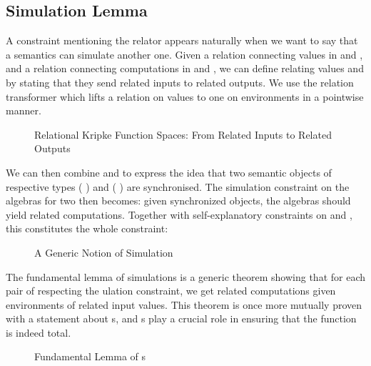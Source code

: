

\subsection{Simulation Lemma}\label{section:simulation}

A constraint mentioning the relator appears naturally when we want to say that a
semantics can simulate another one. Given a relation  connecting values
in  and , and a relation  connecting computations in
 and , we can define  relating values
   and   
by stating that they send related inputs to related outputs. We use
the relation transformer  which lifts a relation on values
to one on environments in a pointwise manner.

\begin{figure}[h]
\caption{Relational Kripke Function Spaces: From Related Inputs to Related Outputs}
\end{figure}

We can then combine  and  to express the idea
that two semantic objects of respective types
   (  ) and
   (  ) are
synchronised. The simulation constraint on the algebras for two \semrec{}
then becomes: given synchronized objects, the algebras should yield
related computations. Together with self-explanatory constraints on
 and , this constitutes the whole 
constraint:

\begin{figure}[h]
\caption{A Generic Notion of Simulation}
\end{figure}

The fundamental lemma of simulations is a generic theorem showing that for
each pair of \semrec{} respecting the ulation constraint, we
get related computations given environments of related input values. This
theorem is once more mutually proven with a statement about s,
and s play a crucial role in ensuring that the function is indeed total.

\begin{figure}[h]
\caption{Fundamental Lemma of s}
\end{figure}


